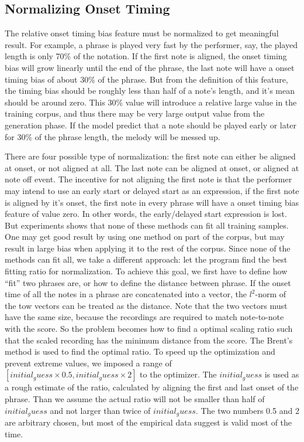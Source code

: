    \subsection{Normalizing Onset Timing}
   The relative onset timing bias feature must be normalized to get meaningful result. For example, a phrase is played very fast by the performer, say, the played length is only 70\% of the notation. If the first note is aligned, the onset timing bias will grow linearly until the end of the phrase, the last note will have a onset timing bias of about 30\% of the phrase. But from the definition of this feature, the timing bias should be roughly less than half of  a note's length, and it's mean should be around zero. This 30\% value will introduce a relative large value in the training corpus, and thus there may be very large output value from the generation phase. If the model predict that a note should be played early or later for 30\% of the phrase length, the melody will be messed up. 

   There are four possible type of normalization: the first note can either be aligned at onset, or not aligned at all. The last note can be aligned at onset, or aligned at note off event.  The incentive for not aligning the first note is that the performer may intend to use an early start or delayed start as an expression, if the first note is aligned by it's onset, the first note in every phrase will have a onset timing bias feature of value zero. In other words, the early/delayed start expression is lost. %
   But experiments shows that none of these methods can fit all training samples. One may get good result by using one method on part of the corpus, but may result in large bias when applying it to the rest of the corpus. Since none of the methods can fit all, we take a different approach: let the program find the best fitting ratio for normalization. To achieve this goal, we first have to define how ``fit'' two phrases are, or how to define the distance between phrase. If the onset time of all the notes in a phrase are concatenated into a vector, the $l^2$-norm of the tow vectors can be treated as the distance. Note that the two vectors must have the same size, because the recordings are required to match note-to-note with the score. So the problem becomes how to find a optimal scaling ratio such that the scaled recording has the minimum distance from the score. The Brent's method\cite{TODO:brent1973} is used to find the optimal ratio. To speed up the optimization and prevent extreme values, we imposed a range of $[initial_guess \times 0.5 , initial_guess \times 2]$ to the optimizer. The $initial_guess$ is used as a rough estimate of the ratio, calculated by aligning the first and last onset of the phrase. Than we assume the actual ratio will not be smaller than half of $initial_guess$ and not larger than twice of $initial_guess$. The two numbers 0.5 and 2 are arbitrary chosen, but most of the empirical data suggest is valid most of the time. 


